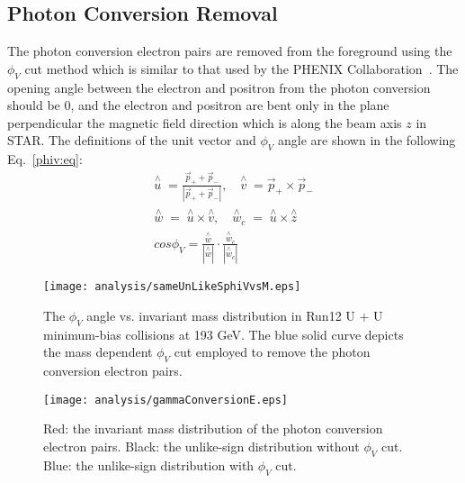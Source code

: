\subsection{Photon Conversion Removal}
The photon conversion electron pairs are removed from the foreground using the $\phi_{V}$ cut method which is similar to that used by the PHENIX Collaboration~\cite{PHENIX:dielectron0}. The opening angle between the electron and positron from the photon conversion should be 0, and the electron and positron are bent only in the plane perpendicular the magnetic field direction which is along the beam axis $z$ in STAR. The definitions of the unit vector and $\phi_{V}$ angle are shown in the following Eq.~\ref{phiv:eq}:
\begin{equation}
\begin{split}
\stackrel{\wedge}{u}\;= \frac{\overrightarrow{p}_{+} + \overrightarrow{p}_{-}}{|\overrightarrow{p}_{+} + \overrightarrow{p}_{-}|}, \quad
\stackrel{\wedge}v\;= \overrightarrow{p}_{+} \times \overrightarrow{p}_{-} \\
\stackrel{\wedge}w\;=\;\stackrel{\wedge}u \times \stackrel{\wedge}v, \quad
\stackrel{\wedge}w_{c}\;=\;\stackrel{\wedge}u \times \stackrel{\wedge}z \\
cos\phi_{V} = \frac{\stackrel{\wedge}w}{|\stackrel{\wedge}w|} \cdot \frac{\stackrel{\wedge}w_{c}}{|\stackrel{\wedge}w_{c}|}
\label{phiv:eq}
\end{split}
\end{equation}

\begin{figure}[htbp]
\begin{minipage}[htbp]{0.48\linewidth}
\centering
\texttt{[image: analysis/sameUnLikeSphiVvsM.eps]}
\caption{The $\phi_{V}$ angle vs. invariant mass distribution in Run12 U + U minimum-bias collisions at 193 GeV. The blue solid curve depicts the mass dependent $\phi_{V}$ cut employed to remove the photon conversion electron pairs.\label{phiv:plot}}
\end{minipage}
\hfill
\begin{minipage}[htbp]{0.48\linewidth}
\centering
\texttt{[image: analysis/gammaConversionE.eps]} 
\caption{Red: the invariant mass distribution of the photon conversion electron pairs. Black: the unlike-sign distribution without $\phi_{V}$ cut. Blue: the unlike-sign distribution with $\phi_{V}$ cut.\label{gammaconversion}}
\end{minipage}
\end{figure}

